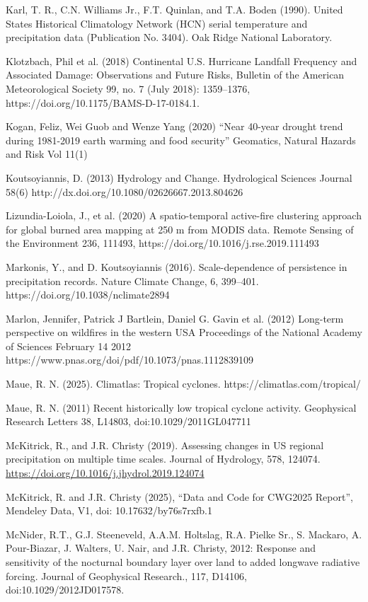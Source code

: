 \documentclass[12pt,paper=a4,DIV=12,parskip=never,chapterprefix=false,headings=standardclasses]{scrreprt}
\begin{document}
Karl, T. R., C.N. Williams Jr., F.T. Quinlan, and T.A. Boden (1990). United States Historical
Climatology Network (HCN) serial temperature and precipitation data (Publication No. 3404). Oak
Ridge National Laboratory.

Klotzbach, Phil et al. (2018) Continental U.S. Hurricane Landfall Frequency and Associated Damage:
Observations and Future Risks, Bulletin of the American Meteorological Society 99, no. 7 (July
2018): 1359–1376, https://doi.org/10.1175/BAMS-D-17-0184.1.

Kogan, Feliz, Wei Guob and Wenze Yang (2020) “Near 40-year drought trend during 1981-2019 earth
warming and food security” Geomatics, Natural Hazards and Risk Vol 11(1)

Koutsoyiannis, D. (2013) Hydrology and Change. Hydrological Sciences Journal 58(6)
http://dx.doi.org/10.1080/02626667.2013.804626

Lizundia-Loiola, J., et al. (2020) A spatio-temporal active-fire clustering approach for global burned area
mapping at 250 m from MODIS data. Remote Sensing of the Environment 236, 111493,
https://doi.org/10.1016/j.rse.2019.111493

Markonis, Y., and D. Koutsoyiannis (2016). Scale-dependence of persistence in precipitation records.
Nature Climate Change, 6, 399–401. https://doi.org/10.1038/nclimate2894

Marlon, Jennifer, Patrick J Bartlein, Daniel G. Gavin et al. (2012) Long-term perspective on wildfires in
the western USA Proceedings of the National Academy of Sciences February 14 2012
https://www.pnas.org/doi/pdf/10.1073/pnas.1112839109

Maue, R. N. (2025). Climatlas: Tropical cyclones. https://climatlas.com/tropical/

Maue, R. N. (2011) Recent historically low tropical cyclone activity. Geophysical Research Letters 38,
L14803, doi:10.1029/2011GL047711

McKitrick, R., and J.R. Christy (2019). Assessing changes in US regional precipitation on multiple time
scales. Journal of Hydrology, 578, 124074. \url{https://doi.org/10.1016/j.jhydrol.2019.124074}

McKitrick, R. and J.R. Christy (2025), “Data and Code for CWG2025 Report”, Mendeley Data, V1, doi:
10.17632/by76s7rxfb.1

McNider, R.T., G.J. Steeneveld, A.A.M. Holtslag, R.A. Pielke Sr., S. Mackaro, A. Pour-Biazar, J.
Walters, U. Nair, and J.R. Christy, 2012: Response and sensitivity of the nocturnal boundary layer
over land to added longwave radiative forcing. Journal of Geophysical Research., 117, D14106,
doi:10.1029/2012JD017578.
\end{document}
